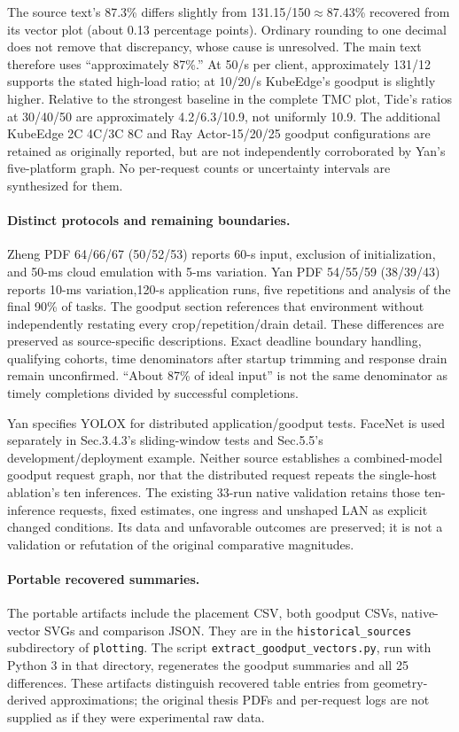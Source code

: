 The source text's 87.3\% differs slightly from 131.15/150$\approx$87.43\% recovered from its vector plot (about 0.13 percentage points). Ordinary rounding to one decimal does not remove that discrepancy, whose cause is unresolved. The main text therefore uses ``approximately 87\%.'' At 50/s per client, approximately 131/12 supports the stated high-load ratio; at 10/20/s KubeEdge's goodput is slightly higher. Relative to the strongest baseline in the complete TMC plot, Tide's ratios at 30/40/50 are approximately 4.2/6.3/10.9, not uniformly 10.9. The additional KubeEdge 2C 4C/3C 8C and Ray Actor-15/20/25 goodput configurations are retained as originally reported, but are not independently corroborated by Yan's five-platform graph. No per-request counts or uncertainty intervals are synthesized for them.

\paragraph{Distinct protocols and remaining boundaries.}
Zheng PDF 64/66/67 (50/52/53) reports 60-s input, exclusion of initialization, and 50-ms cloud emulation with 5-ms variation. Yan PDF 54/55/59 (38/39/43) reports 10-ms variation,120-s application runs, five repetitions and analysis of the final 90\% of tasks. The goodput section references that environment without independently restating every crop/repetition/drain detail. These differences are preserved as source-specific descriptions. Exact deadline boundary handling, qualifying cohorts, time denominators after startup trimming and response drain remain unconfirmed. ``About 87\% of ideal input'' is not the same denominator as timely completions divided by successful completions.

Yan specifies YOLOX for distributed application/goodput tests. FaceNet is used separately in Sec.3.4.3's sliding-window tests and Sec.5.5's development/deployment example. Neither source establishes a combined-model goodput request graph, nor that the distributed request repeats the single-host ablation's ten inferences. The existing 33-run native validation retains those ten-inference requests, fixed estimates, one ingress and unshaped LAN as explicit changed conditions. Its data and unfavorable outcomes are preserved; it is not a validation or refutation of the original comparative magnitudes.

\paragraph{Portable recovered summaries.}
The portable artifacts include the placement CSV, both goodput CSVs, native-vector SVGs and comparison JSON. They are in the \texttt{historical\_sources} subdirectory of \texttt{plotting}. The script \texttt{extract\_goodput\_vectors.py}, run with Python 3 in that directory, regenerates the goodput summaries and all 25 differences. These artifacts distinguish recovered table entries from geometry-derived approximations; the original thesis PDFs and per-request logs are not supplied as if they were experimental raw data.

